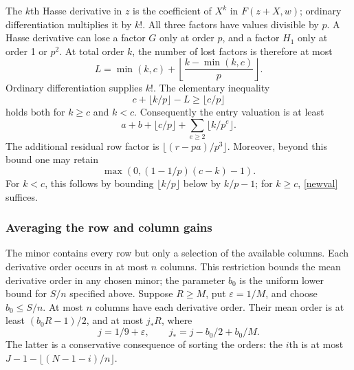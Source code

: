 \documentclass[11pt]{article}
\begin{document}
The \(k\)th Hasse derivative in \(z\) is the coefficient of \(X^k\)
in \(F(z+X,w)\); ordinary differentiation multiplies it by \(k!\).
All three factors have values divisible by \(p\). A Hasse derivative
can lose a factor \(G\) only at order \(p\), and a factor \(H_1\)
only at order 1 or \(p^2\). At total order \(k\), the number of lost
factors is therefore at most
\[
 L=\min(k,c)+\left\lfloor\frac{k-\min(k,c)}p\right\rfloor.
\]
Ordinary differentiation supplies \(k!\). The elementary inequality
\[
 c+\lfloor k/p\rfloor-L\ge\lfloor c/p\rfloor
\]
holds both for \(k\ge c\) and \(k<c\). Consequently the entry
valuation is at least
\begin{equation}\label{newval}
 a+b+\lfloor c/p\rfloor+\sum_{e\ge2}\lfloor k/p^e\rfloor.
\end{equation}
The additional residual row factor is
\(\lfloor(r-pa)/p^3\rfloor\). Moreover, beyond this bound one may
retain
\begin{equation}\label{coupled-entry}
 \max\left(0,(1-1/p)(c-k)-1\right).
\end{equation}
For \(k<c\), this follows by bounding \(\lfloor k/p\rfloor\)
below by \(k/p-1\); for \(k\ge c\), \eqref{newval} suffices.

\subsubsection{Averaging the row and column gains}
The minor contains every row but only a selection of the available
columns. Each derivative order occurs in at most \(n\) columns.
This restriction bounds the mean derivative order in any chosen minor;
the parameter \(b_0\) is the uniform lower bound for \(S/n\)
specified above.
Suppose \(R\ge M\), put \(\varepsilon=1/M\), and choose
\(b_0\le S/n\). At most \(n\) columns have each derivative order.
Their mean order is at least \((b_0R-1)/2\), and at most \(j_*R\),
where
\begin{equation}\label{jstar}
 j=1/9+\varepsilon,\qquad j_*=j-b_0/2+b_0/M.
\end{equation}
The latter is a conservative consequence of sorting the orders:
the \(i\)th is at most \(J-1-\lfloor(N-1-i)/n\rfloor\).
\end{document}
